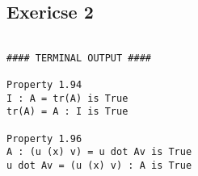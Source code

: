 \documentclass[a4paper,norsk]{article}
\begin{document}
\subsection*{Exericse 2}



\begin{lstlisting}[style=terminal]

#### TERMINAL OUTPUT ####

Property 1.94
I : A = tr(A) is True
tr(A) = A : I is True 

Property 1.96
A : (u (x) v) = u dot Av is True
u dot Av = (u (x) v) : A is True
\end{lstlisting}
\end{document}
